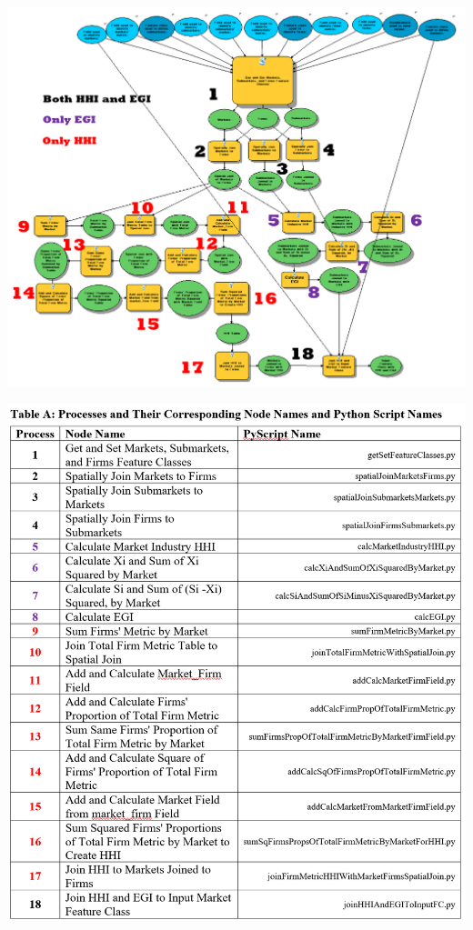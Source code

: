 \documentclass[]{article}
\begin{document}
\includegraphics[width=19.79in]{11}

\includegraphics[width=17in]{12}
\end{document}
